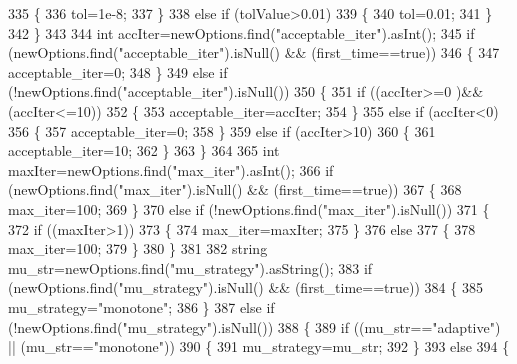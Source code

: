 \begin{DoxyCode}
335         \{
336             tol=1e-8;
337         \}
338         \textcolor{keywordflow}{else} \textcolor{keywordflow}{if} (tolValue>0.01)
339         \{
340             tol=0.01;
341         \}
342     \}
343 
344     \textcolor{keywordtype}{int} accIter=newOptions.find(\textcolor{stringliteral}{"acceptable\_iter"}).asInt();
345     \textcolor{keywordflow}{if} (newOptions.find(\textcolor{stringliteral}{"acceptable\_iter"}).isNull() && (first\_time==\textcolor{keyword}{true}))
346     \{
347         acceptable_iter=0;
348     \}
349     \textcolor{keywordflow}{else} \textcolor{keywordflow}{if} (!newOptions.find(\textcolor{stringliteral}{"acceptable\_iter"}).isNull())
350     \{
351         \textcolor{keywordflow}{if} ((accIter>=0 )&& (accIter<=10))
352         \{
353              acceptable_iter=accIter;
354         \}
355         \textcolor{keywordflow}{else} \textcolor{keywordflow}{if} (accIter<0)
356         \{
357             acceptable_iter=0;
358         \}
359         \textcolor{keywordflow}{else} \textcolor{keywordflow}{if} (accIter>10)
360         \{
361             acceptable_iter=10;
362         \}
363     \}
364 
365     \textcolor{keywordtype}{int} maxIter=newOptions.find(\textcolor{stringliteral}{"max\_iter"}).asInt();
366     \textcolor{keywordflow}{if} (newOptions.find(\textcolor{stringliteral}{"max\_iter"}).isNull() && (first\_time==\textcolor{keyword}{true}))
367     \{
368         max_iter=100;
369     \}
370     \textcolor{keywordflow}{else} \textcolor{keywordflow}{if} (!newOptions.find(\textcolor{stringliteral}{"max\_iter"}).isNull())
371     \{
372         \textcolor{keywordflow}{if} ((maxIter>1))
373         \{
374             max_iter=maxIter;
375         \}
376         \textcolor{keywordflow}{else}
377         \{
378             max_iter=100;
379         \}
380     \}
381 
382     \textcolor{keywordtype}{string} mu\_str=newOptions.find(\textcolor{stringliteral}{"mu\_strategy"}).asString();
383     \textcolor{keywordflow}{if} (newOptions.find(\textcolor{stringliteral}{"mu\_strategy"}).isNull() && (first\_time==\textcolor{keyword}{true}))
384     \{
385         mu_strategy=\textcolor{stringliteral}{"monotone"};
386     \}
387     \textcolor{keywordflow}{else} \textcolor{keywordflow}{if} (!newOptions.find(\textcolor{stringliteral}{"mu\_strategy"}).isNull())
388     \{
389         \textcolor{keywordflow}{if} ((mu\_str==\textcolor{stringliteral}{"adaptive"}) || (mu\_str==\textcolor{stringliteral}{"monotone"}))
390         \{
391             mu_strategy=mu\_str;
392         \}
393         \textcolor{keywordflow}{else}
394         \{

\end{DoxyCode}
